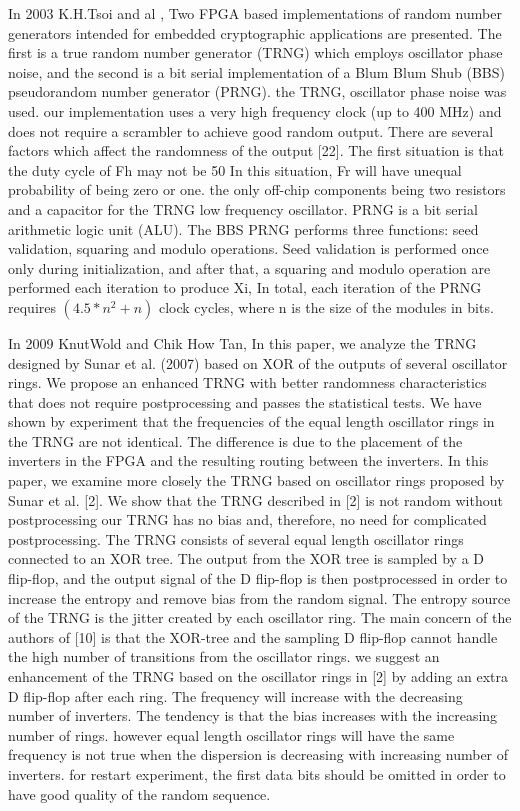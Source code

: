 In 2003 K.H.Tsoi and al , Two FPGA based implementations of random number generators intended for embedded cryptographic applications are presented. The first is a true random number generator (TRNG) which employs oscillator phase noise, and the second is a bit serial implementation of a Blum Blum Shub (BBS) pseudorandom number generator (PRNG). the TRNG, oscillator phase noise was used. our implementation uses a very high frequency clock (up to 400 MHz) and does not require a scrambler to achieve good random output. There are several factors which affect the randomness of the output [22]. The first situation is that the duty cycle of Fh may not be 50%
In this situation, Fr will have unequal probability of being zero or one. the only off-chip components being two resistors and a capacitor for the TRNG low frequency oscillator. PRNG is a bit serial arithmetic logic unit (ALU). The BBS PRNG performs three functions: seed validation, squaring and modulo operations. Seed validation is
performed once only during initialization, and after that, a squaring and modulo operation are performed each iteration to produce Xi, In total, each iteration of the PRNG requires $(4.5*n^{2} + n)$ clock cycles, where n is the size of the modules in bits.

In 2009 KnutWold and Chik How Tan, In this paper, we analyze the TRNG designed by Sunar et al. (2007) based on XOR of the outputs of several oscillator rings. We propose an enhanced TRNG with better randomness characteristics that does not require postprocessing and passes the statistical tests. We have shown by experiment that the frequencies of the equal length oscillator rings in the TRNG are not identical. The difference is due to the placement of the inverters in the FPGA and the resulting routing between the inverters. In this paper, we examine more closely the TRNG based on oscillator rings proposed by Sunar et al. [2]. We show that the TRNG described in [2] is not random without postprocessing our TRNG has no bias and, therefore, no need for complicated postprocessing. The TRNG consists of several equal length oscillator rings connected to an XOR tree. The output from the XOR tree is sampled by a D flip-flop, and the output signal of the D flip-flop is then postprocessed in order to increase the entropy and remove bias from the random signal. The entropy source of the TRNG is the jitter created by each oscillator ring. The main concern of the authors of [10] is that the XOR-tree and the sampling D flip-flop cannot handle the high number of transitions from the oscillator rings. we suggest an enhancement of the TRNG based on the oscillator rings in [2] by adding an extra D flip-flop after each ring. The frequency will increase with the decreasing number of inverters. The tendency is that the bias increases with the increasing number of rings. however equal length oscillator rings will have the same frequency is not true when the dispersion is decreasing with increasing number of inverters. for restart experiment, the first data bits should be omitted in order to have good quality of the random sequence.

